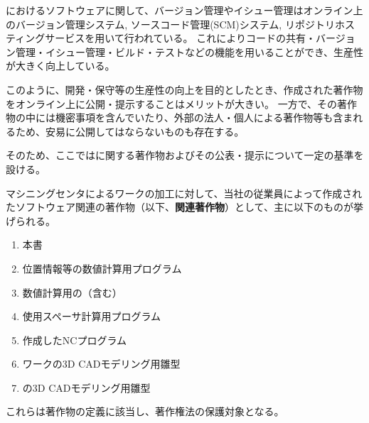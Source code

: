 

\DMC におけるソフトウェアに関して、バージョン管理やイシュー管理はオンライン上のバージョン管理システム, ソースコード管理(SCM)システム, リポジトリホスティングサービスを用いて行われている。
これによりコードの共有・バージョン管理・イシュー管理・ビルド・テストなどの機能を用いることができ、生産性が大きく向上している。

このように、開発・保守等の生産性の向上を目的としたとき、作成された著作物をオンライン上に公開・提示することはメリットが大きい。
一方で、その著作物の中には機密事項を含んでいたり、外部の法人・個人による著作物等も含まれるため、安易に公開してはならないものも存在する。

そのため、ここでは\DMC に関する著作物およびその公表・提示について一定の基準を設ける。



マシニングセンタによるワークの加工に対して、当社の従業員によって作成されたソフトウェア関連の著作物（以下、\textbf{関連著作物}）として、主に以下のものが挙げられる。
\begin{enumerate}[label=\sarrow]
\item 本書
\item 位置情報等の数値計算用プログラム
\item {}数値計算用の\nameIDTaperTable（\InnerCornerR 含む）
\item {}使用スペーサ計算用プログラム
\item 作成したNCプログラム
\item {}ワークの3D CADモデリング用雛型
\item {}\nameIDTaper の3D CADモデリング用雛型
\end{enumerate}
これらは著作物の定義に該当し、著作権法の保護対象となる。



